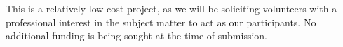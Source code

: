 This is a relatively low-cost project, as we will be soliciting volunteers with a professional interest in the subject matter to act as our participants.
No additional funding is being sought at the time of submission.